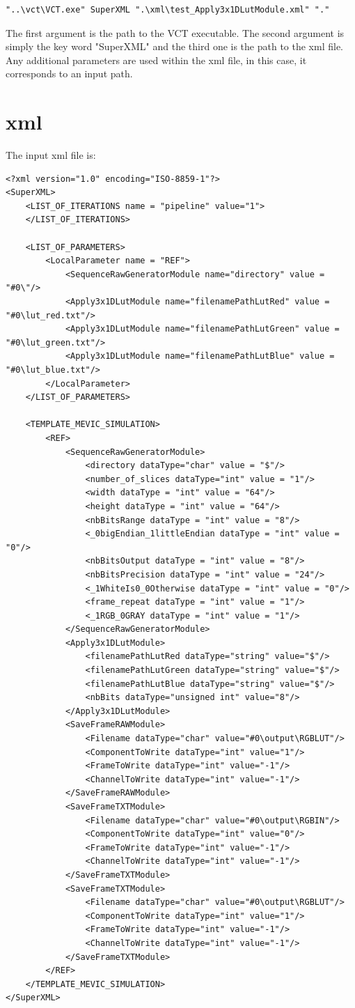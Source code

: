 \lstset{language=C++}
\begin{lstlisting}
"..\vct\VCT.exe" SuperXML ".\xml\test_Apply3x1DLutModule.xml" "."
\end{lstlisting}

The first argument is the path to the VCT executable. The second argument is simply the key word "SuperXML" and the third one is the path to the xml file. Any additional parameters are used within the xml file, in this case, it corresponds to an input path.

\section{xml}

The input xml file is:

\lstset{language=XML}
\begin{lstlisting}
<?xml version="1.0" encoding="ISO-8859-1"?>
<SuperXML>
	<LIST_OF_ITERATIONS name = "pipeline" value="1">	
	</LIST_OF_ITERATIONS>
	
	<LIST_OF_PARAMETERS>
		<LocalParameter name = "REF">
			<SequenceRawGeneratorModule name="directory" value = "#0\"/>
			<Apply3x1DLutModule name="filenamePathLutRed" value = "#0\lut_red.txt"/>
			<Apply3x1DLutModule name="filenamePathLutGreen" value = "#0\lut_green.txt"/>
			<Apply3x1DLutModule name="filenamePathLutBlue" value = "#0\lut_blue.txt"/>
		</LocalParameter>				
	</LIST_OF_PARAMETERS>

	<TEMPLATE_MEVIC_SIMULATION>
		<REF>
			<SequenceRawGeneratorModule>
				<directory dataType="char" value = "$"/>
				<number_of_slices dataType="int" value = "1"/>
				<width dataType = "int" value = "64"/>
				<height dataType = "int" value = "64"/>
				<nbBitsRange dataType = "int" value = "8"/>
				<_0bigEndian_1littleEndian dataType = "int" value = "0"/>
				<nbBitsOutput dataType = "int" value = "8"/>
				<nbBitsPrecision dataType = "int" value = "24"/>
				<_1WhiteIs0_0Otherwise dataType = "int" value = "0"/>
				<frame_repeat dataType = "int" value = "1"/>
				<_1RGB_0GRAY dataType = "int" value = "1"/>			
			</SequenceRawGeneratorModule>
			<Apply3x1DLutModule>
				<filenamePathLutRed dataType="string" value="$"/>
				<filenamePathLutGreen dataType="string" value="$"/>
				<filenamePathLutBlue dataType="string" value="$"/>
				<nbBits dataType="unsigned int" value="8"/>
			</Apply3x1DLutModule>		
			<SaveFrameRAWModule>
				<Filename dataType="char" value="#0\output\RGBLUT"/>
				<ComponentToWrite dataType="int" value="1"/>
				<FrameToWrite dataType="int" value="-1"/>
				<ChannelToWrite dataType="int" value="-1"/>
			</SaveFrameRAWModule>
			<SaveFrameTXTModule>
				<Filename dataType="char" value="#0\output\RGBIN"/>
				<ComponentToWrite dataType="int" value="0"/>
				<FrameToWrite dataType="int" value="-1"/>
				<ChannelToWrite dataType="int" value="-1"/>
			</SaveFrameTXTModule>	
			<SaveFrameTXTModule>
				<Filename dataType="char" value="#0\output\RGBLUT"/>
				<ComponentToWrite dataType="int" value="1"/>
				<FrameToWrite dataType="int" value="-1"/>
				<ChannelToWrite dataType="int" value="-1"/>
			</SaveFrameTXTModule>			
		</REF>	
	</TEMPLATE_MEVIC_SIMULATION>
</SuperXML>
\end{lstlisting}

